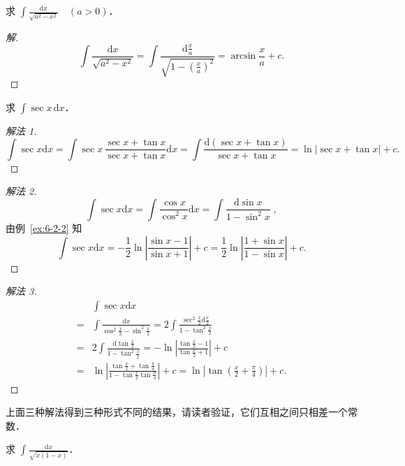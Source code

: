 \begin{example}\label{ex:6-2-3}
求 $\displaystyle\int\frac{\mathrm{d}x}{\sqrt{a^{2}-x^{2}}}\quad(a > 0)$．
\end{example}

\begin{proof}[解]
\[
\int\frac{\mathrm{d}x}{\sqrt{a^{2}-x^{2}}}
= \int\frac{\mathrm{d}\frac{x}{a}}{\sqrt{1-\left(\frac{x}{a}\right)^{2}}}
= \arcsin\frac{x}{a} + c.
\]
\end{proof}

\begin{example}\label{ex:6-2-4}
求 $\displaystyle\int\sec x\,\mathrm{d}x$．
\end{example}

\begin{proof}[解法 1]
\[
\int\sec x\mathrm{d}x
= \int\sec x\,\frac{\sec x+\tan x}{\sec x+\tan x}\mathrm{d}x
= \int\frac{\mathrm{d}(\sec x+\tan x)}{\sec x+\tan x}
= \ln\left|\sec x+\tan x\right|+c.
\]
\end{proof}

\begin{proof}[解法 2]
\[
\int\sec x\mathrm{d}x = \int\frac{\cos x}{\cos^{2}x}\mathrm{d}x = \int\frac{\mathrm{d}\sin x}{1-\sin^{2}x}\;,
\]
由例~\ref{ex:6-2-2} 知
\[
\int\sec x\mathrm{d}x
= -\frac{1}{2}\ln\left|\frac{\sin x-1}{\sin x+1}\right|+c
= \frac{1}{2}\ln\left|\frac{1+\sin x}{1-\sin x}\right|+c.
\]
\end{proof}

\begin{proof}[解法 3]
\begin{align*}
&\int\sec x\mathrm{d}x\\
={}& \int\frac{\mathrm{d}x}{\cos^{2}\frac{x}{2}-\sin^{2}\frac{x}{2}}
= 2\int\frac{\sec^{2}\frac{x}{2}\mathrm{d}\frac{x}{2}}{1-\tan^{2}\frac{x}{2}}\\
={}& 2\int\frac{\mathrm{d}\tan\frac{x}{2}}{1-\tan^{2}\frac{x}{2}}
= -\ln\left|\frac{\tan\frac{x}{2}-1}{\tan\frac{x}{2}+1}\right|+c\\
={}& \ln\left|\frac{\tan\frac{x}{2}+\tan\frac{\pi}{4}}{1-\tan\frac{x}{2}\tan\frac{\pi}{4}}\right|+c
= \ln\left|\tan\left(\frac{x}{2}+\frac{\pi}{4}\right)\right|+c.
\end{align*}
\end{proof}

上面三种解法得到三种形式不同的结果，请读者验证，它们互相之间只相差一个常数．

\begin{example}\label{ex:6-2-5}
求 $\displaystyle\int\frac{\mathrm{d}x}{\sqrt{x(1-x)}}$．
\end{example}

